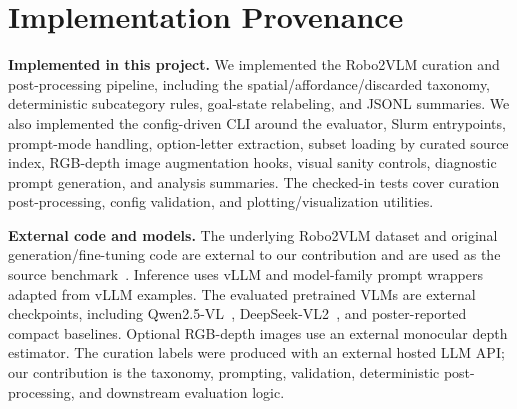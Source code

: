 \section{Implementation Provenance}
\label{sec:implementation}

\textbf{Implemented in this project.}
We implemented the Robo2VLM curation and post-processing pipeline, including the spatial/affordance/discarded taxonomy, deterministic subcategory rules, goal-state relabeling, and JSONL summaries. We also implemented the config-driven CLI around the evaluator, Slurm entrypoints, prompt-mode handling, option-letter extraction, subset loading by curated source index, RGB-depth image augmentation hooks, visual sanity controls, diagnostic prompt generation, and analysis summaries. The checked-in tests cover curation post-processing, config validation, and plotting/visualization utilities.

\textbf{External code and models.}
The underlying Robo2VLM dataset and original generation/fine-tuning code are external to our contribution and are used as the source benchmark~\cite{chen2025robo2vlm}. Inference uses vLLM and model-family prompt wrappers adapted from vLLM examples. The evaluated pretrained VLMs are external checkpoints, including Qwen2.5-VL~\cite{bai2025qwen25vl}, DeepSeek-VL2~\cite{wu2024deepseekvl2}, and poster-reported compact baselines. Optional RGB-depth images use an external monocular depth estimator. The curation labels were produced with an external hosted LLM API; our contribution is the taxonomy, prompting, validation, deterministic post-processing, and downstream evaluation logic.
